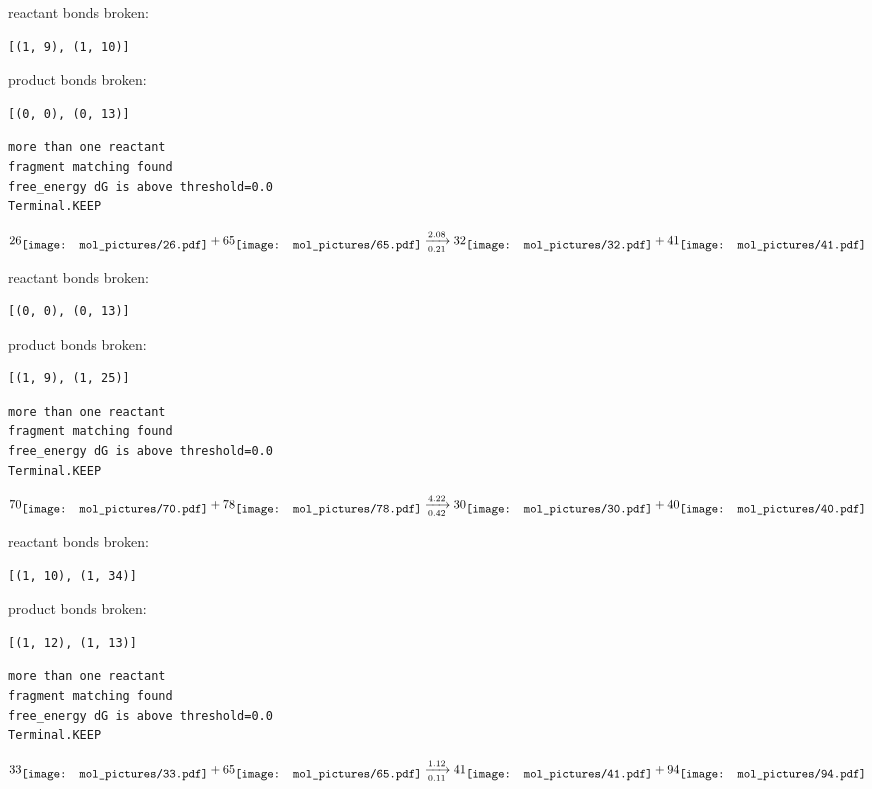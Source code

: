 \documentclass{article}
\begin{document}
reactant bonds broken:\begin{verbatim}
[(1, 9), (1, 10)]
\end{verbatim}
product bonds broken:\begin{verbatim}
[(0, 0), (0, 13)]
\end{verbatim}




\vspace{1cm}
\begin{verbatim}
more than one reactant
fragment matching found
free_energy dG is above threshold=0.0
Terminal.KEEP
\end{verbatim}
$$
26
\raisebox{-.5\height}{\texttt{[image: mol\_pictures/26.pdf]}}
+
65
\raisebox{-.5\height}{\texttt{[image: mol\_pictures/65.pdf]}}
\xrightarrow[0.21]{2.08}
32
\raisebox{-.5\height}{\texttt{[image: mol\_pictures/32.pdf]}}
+
41
\raisebox{-.5\height}{\texttt{[image: mol\_pictures/41.pdf]}}
$$


reactant bonds broken:\begin{verbatim}
[(0, 0), (0, 13)]
\end{verbatim}
product bonds broken:\begin{verbatim}
[(1, 9), (1, 25)]
\end{verbatim}




\vspace{1cm}
\begin{verbatim}
more than one reactant
fragment matching found
free_energy dG is above threshold=0.0
Terminal.KEEP
\end{verbatim}
$$
70
\raisebox{-.5\height}{\texttt{[image: mol\_pictures/70.pdf]}}
+
78
\raisebox{-.5\height}{\texttt{[image: mol\_pictures/78.pdf]}}
\xrightarrow[0.42]{4.22}
30
\raisebox{-.5\height}{\texttt{[image: mol\_pictures/30.pdf]}}
+
40
\raisebox{-.5\height}{\texttt{[image: mol\_pictures/40.pdf]}}
$$


reactant bonds broken:\begin{verbatim}
[(1, 10), (1, 34)]
\end{verbatim}
product bonds broken:\begin{verbatim}
[(1, 12), (1, 13)]
\end{verbatim}




\vspace{1cm}
\begin{verbatim}
more than one reactant
fragment matching found
free_energy dG is above threshold=0.0
Terminal.KEEP
\end{verbatim}
$$
33
\raisebox{-.5\height}{\texttt{[image: mol\_pictures/33.pdf]}}
+
65
\raisebox{-.5\height}{\texttt{[image: mol\_pictures/65.pdf]}}
\xrightarrow[0.11]{1.12}
41
\raisebox{-.5\height}{\texttt{[image: mol\_pictures/41.pdf]}}
+
94
\raisebox{-.5\height}{\texttt{[image: mol\_pictures/94.pdf]}}
$$
\end{document}
